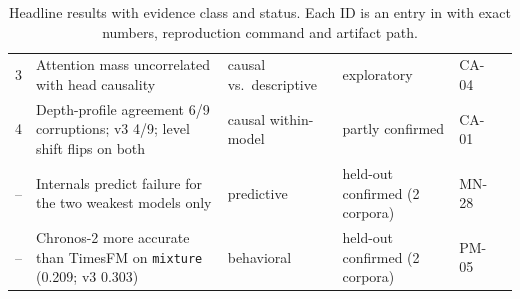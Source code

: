 \begin{table}[!tb]
\begin{tabularx}{\textwidth}{@{}l>{\raggedright}Xllll@{}}
3 & Attention mass uncorrelated with head causality & causal vs.\ descriptive & exploratory & CA-04 \\
4 & Depth-profile agreement 6/9 corruptions; v3 4/9; level shift flips on both & causal within-model & partly confirmed & CA-01 \\
-- & Internals predict failure for the two weakest models only & predictive & held-out confirmed (2 corpora) & MN-28 \\
-- & Chronos-2 more accurate than TimesFM on \texttt{mixture} (0.209; v3 0.303) & behavioral & held-out confirmed (2 corpora) & PM-05 \\
\bottomrule
\end{tabularx}
\caption{Headline results with evidence class and status. Each ID is an entry in  with exact numbers, reproduction command and artifact path.}
\label{tab:results}
\end{table}
